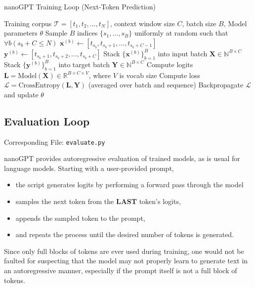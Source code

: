 \documentclass{article} %
\theoremstyle{definition}
\begin{document}
\begin{algorithm}[H]
\caption{nanoGPT Training Loop (Next-Token Prediction)}
\begin{algorithmic}[1]
\Require Training corpus $\mathcal{T} = [t_1, t_2, \ldots, t_N]$, context window size $C$, batch size $B$, Model parameters $\theta$
    \State Sample $B$ indices $\{s_1, \ldots, s_B\}$ uniformly at random such that $\forall b (s_b + C \leq N)$
        \State $\mathbf{x}^{(b)} \gets [t_{s_b}, t_{s_b+1}, \ldots, t_{s_b+C-1}]$ 
        \State $\mathbf{y}^{(b)} \gets [t_{s_b+1}, t_{s_b+2}, \ldots, t_{s_b+C}]$ 
    \EndFor
    \State Stack $\{\mathbf{x}^{(b)}\}_{b=1}^B$ into input batch $\mathbf{X} \in \mathbb{N}^{B \times C}$
    \State Stack $\{\mathbf{y}^{(b)}\}_{b=1}^B$ into target batch $\mathbf{Y} \in \mathbb{N}^{B \times C}$
    \State Compute logits $\mathbf{L} = \mathrm{Model}(\mathbf{X}) \in \mathbb{R}^{B \times C \times V}$, where $V$ is vocab size
    \State Compute loss $\mathcal{L} = \mathrm{CrossEntropy}(\mathbf{L}, \mathbf{Y})$ (averaged over batch and sequence)
    \State Backpropagate $\mathcal{L}$ and update $\theta$
\EndWhile
\end{algorithmic}
\end{algorithm}

\subsection{Evaluation Loop}
Corresponding File: \texttt{evaluate.py}

nanoGPT provides autoregressive evaluation of trained models, as is usual
for language models. Starting with a user-provided prompt,

\begin{itemize}
    \item the script generates logits by performing a forward pass through the model
    \item samples the next token from the \textbf{LAST} token's logits,
    \item appends the sampled token to the prompt,
    \item and repeats the process until the desired number of tokens is generated.
\end{itemize}

Since only full blocks of tokens are ever used during training,
one would not be faulted for suspecting that the model may
not properly learn to generate text in an autoregressive manner,
especially if the prompt itself is not a full block of tokens.
\end{document}
